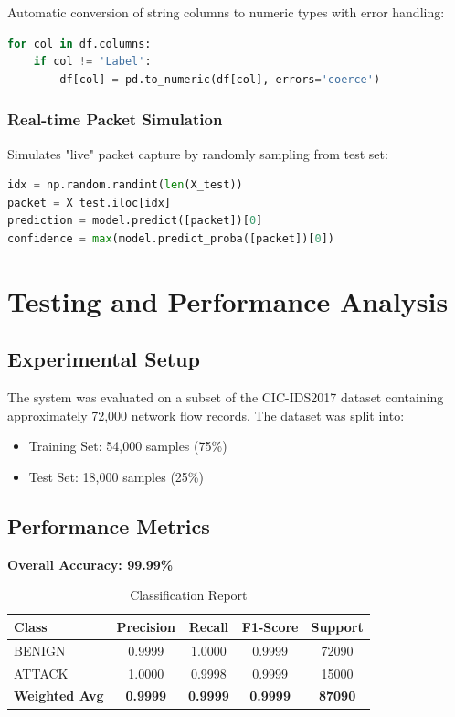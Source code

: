 \documentclass[12pt,a4paper]{article}
\begin{document}
Automatic conversion of string columns to numeric types with error handling:

\begin{lstlisting}[language=Python]
for col in df.columns:
    if col != 'Label':
        df[col] = pd.to_numeric(df[col], errors='coerce')
\end{lstlisting}

\subsubsection{Real-time Packet Simulation}

Simulates "live" packet capture by randomly sampling from test set:

\begin{lstlisting}[language=Python]
idx = np.random.randint(len(X_test))
packet = X_test.iloc[idx]
prediction = model.predict([packet])[0]
confidence = max(model.predict_proba([packet])[0])
\end{lstlisting}

\section{Testing and Performance Analysis}

\subsection{Experimental Setup}

The system was evaluated on a subset of the CIC-IDS2017 dataset containing approximately 72,000 network flow records. The dataset was split into:

\begin{itemize}
    \item Training Set: 54,000 samples (75\%)
    \item Test Set: 18,000 samples (25\%)
\end{itemize}

\subsection{Performance Metrics}

\textbf{Overall Accuracy: 99.99\%}

\begin{table}[H]
\centering
\begin{tabular}{|l|c|c|c|c|}
\hline
\textbf{Class} & \textbf{Precision} & \textbf{Recall} & \textbf{F1-Score} & \textbf{Support} \\
\hline
BENIGN & 0.9999 & 1.0000 & 0.9999 & 72090 \\
ATTACK & 1.0000 & 0.9998 & 0.9999 & 15000 \\
\hline
\textbf{Weighted Avg} & \textbf{0.9999} & \textbf{0.9999} & \textbf{0.9999} & \textbf{87090} \\
\hline
\end{tabular}
\caption{Classification Report}
\end{table}
\end{document}
